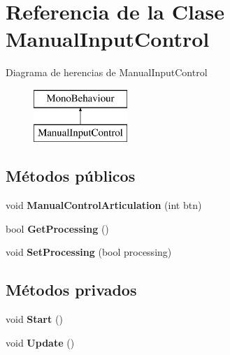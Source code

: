 \hypertarget{class_manual_input_control}{}\section{Referencia de la Clase Manual\+Input\+Control}
\label{class_manual_input_control}
Diagrama de herencias de Manual\+Input\+Control\begin{figure}[H]
\begin{center}
\leavevmode
\includegraphics[height=2.000000cm]{class_manual_input_control}
\end{center}
\end{figure}
\subsection*{Métodos públicos}
\begin{DoxyCompactItemize}
\item 
\mbox{\label{class_manual_input_control_a1e39de6319d6aad69e82f083d6d42058}} 
void {\bfseries Manual\+Control\+Articulation} (int btn)
\item 
\mbox{\label{class_manual_input_control_a00de8f95d74cefb32806a4262fd90aba}} 
bool {\bfseries Get\+Processing} ()
\item 
\mbox{\label{class_manual_input_control_a8505abe190f5ce3a1a1b76d2e94e695f}} 
void {\bfseries Set\+Processing} (bool processing)
\end{DoxyCompactItemize}
\subsection*{Métodos privados}
\begin{DoxyCompactItemize}
\item 
\mbox{\label{class_manual_input_control_acc8776421340f27cc602a8b20dae4c3f}} 
void {\bfseries Start} ()
\item 
\mbox{\label{class_manual_input_control_a1f99322a0b2569fe0a38a8ffa594a7ac}} 
void {\bfseries Update} ()
\end{DoxyCompactItemize}
